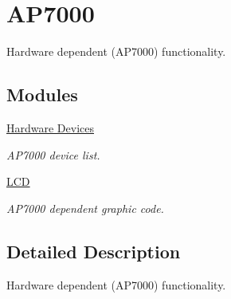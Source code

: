 \hypertarget{group___a_p7}{
\section{AP7000}
\label{group___a_p7}
}
Hardware dependent (AP7000) functionality.  


\subsection*{Modules}
\begin{CompactItemize}
\item 
\hyperlink{group__ap7000__hardware__devices}{Hardware Devices}
\begin{CompactList}\small\item\em AP7000 device list. \item\end{CompactList}

\item 
\hyperlink{group__ap7000__lcd}{LCD}
\begin{CompactList}\small\item\em AP7000 dependent graphic code. \item\end{CompactList}

\end{CompactItemize}


\subsection{Detailed Description}
Hardware dependent (AP7000) functionality. 